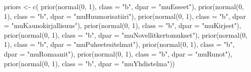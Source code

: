 \documentclass[
  letterpaper,
  DIV=11,
  numbers=noendperiod]{scrartcl}
\newenvironment{Shaded}{\begin{snugshade}}{\end{snugshade}}
\newcommand{\AttributeTok}[1]{\textcolor[rgb]{0.40,0.45,0.13}{#1}}
\newcommand{\DecValTok}[1]{\textcolor[rgb]{0.68,0.00,0.00}{#1}}
\newcommand{\FunctionTok}[1]{\textcolor[rgb]{0.28,0.35,0.67}{#1}}
\newcommand{\NormalTok}[1]{\textcolor[rgb]{0.00,0.23,0.31}{#1}}
\newcommand{\OtherTok}[1]{\textcolor[rgb]{0.00,0.23,0.31}{#1}}
\newcommand{\StringTok}[1]{\textcolor[rgb]{0.13,0.47,0.30}{#1}}
\begin{document}
\begin{Shaded}
\begin{Highlighting}[]
\NormalTok{priors }\OtherTok{\textless{}{-}} \FunctionTok{c}\NormalTok{(}
  \FunctionTok{prior}\NormalTok{(}\FunctionTok{normal}\NormalTok{(}\DecValTok{0}\NormalTok{, }\DecValTok{1}\NormalTok{), }\AttributeTok{class =} \StringTok{"b"}\NormalTok{, }\AttributeTok{dpar =} \StringTok{"muEsseet"}\NormalTok{),}
  \FunctionTok{prior}\NormalTok{(}\FunctionTok{normal}\NormalTok{(}\DecValTok{0}\NormalTok{, }\DecValTok{1}\NormalTok{), }\AttributeTok{class =} \StringTok{"b"}\NormalTok{, }\AttributeTok{dpar =} \StringTok{"muHuumorisatiiri"}\NormalTok{),}
  \FunctionTok{prior}\NormalTok{(}\FunctionTok{normal}\NormalTok{(}\DecValTok{0}\NormalTok{, }\DecValTok{1}\NormalTok{), }\AttributeTok{class =} \StringTok{"b"}\NormalTok{, }\AttributeTok{dpar =} \StringTok{"muKaunokirjallisuus"}\NormalTok{),}
  \FunctionTok{prior}\NormalTok{(}\FunctionTok{normal}\NormalTok{(}\DecValTok{0}\NormalTok{, }\DecValTok{1}\NormalTok{), }\AttributeTok{class =} \StringTok{"b"}\NormalTok{, }\AttributeTok{dpar =} \StringTok{"muKirjeet"}\NormalTok{),}
  \FunctionTok{prior}\NormalTok{(}\FunctionTok{normal}\NormalTok{(}\DecValTok{0}\NormalTok{, }\DecValTok{1}\NormalTok{), }\AttributeTok{class =} \StringTok{"b"}\NormalTok{, }\AttributeTok{dpar =} \StringTok{"muNovellitkertomukset"}\NormalTok{),}
  \FunctionTok{prior}\NormalTok{(}\FunctionTok{normal}\NormalTok{(}\DecValTok{0}\NormalTok{, }\DecValTok{1}\NormalTok{), }\AttributeTok{class =} \StringTok{"b"}\NormalTok{, }\AttributeTok{dpar =} \StringTok{"muPuheetesitelmat"}\NormalTok{),}
  \FunctionTok{prior}\NormalTok{(}\FunctionTok{normal}\NormalTok{(}\DecValTok{0}\NormalTok{, }\DecValTok{1}\NormalTok{), }\AttributeTok{class =} \StringTok{"b"}\NormalTok{, }\AttributeTok{dpar =} \StringTok{"muRomaanit"}\NormalTok{),}
  \FunctionTok{prior}\NormalTok{(}\FunctionTok{normal}\NormalTok{(}\DecValTok{0}\NormalTok{, }\DecValTok{1}\NormalTok{), }\AttributeTok{class =} \StringTok{"b"}\NormalTok{, }\AttributeTok{dpar =} \StringTok{"muRunot"}\NormalTok{),}
  \FunctionTok{prior}\NormalTok{(}\FunctionTok{normal}\NormalTok{(}\DecValTok{0}\NormalTok{, }\DecValTok{1}\NormalTok{), }\AttributeTok{class =} \StringTok{"b"}\NormalTok{, }\AttributeTok{dpar =} \StringTok{"muYhdistelma"}\NormalTok{))}
\end{Highlighting}
\end{Shaded}
\end{document}
